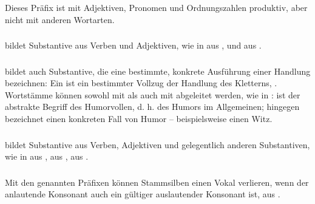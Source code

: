 Dieses Präfix ist mit Adjektiven, Pronomen und Ordnungszahlen produktiv, aber nicht mit anderen Wortarten.

\subsubsection{}  bildet Substantive aus Verben und Adjektiven, wie in   aus , und   aus  . 

\subsubsection{}  bildet auch Substantive, die eine bestimmte, konkrete Ausführung einer Handlung bezeichnen: Ein   ist ein bestimmter Vollzug der Handlung des Kletterns, . Wortstämme können sowohl mit  als auch mit  abgeleitet werden, wie in  :  ist der abstrakte Begriff des Humorvollen, d. h. des Humors im Allgemeinen;  hingegen bezeichnet einen konkreten Fall von Humor -- beispielsweise einen Witz. 

\subsubsection{}  bildet Substantive aus Verben, Adjektiven und gelegentlich anderen Substantiven, wie in   aus  ,   aus  ,   aus  . 

\subsubsection{} Mit den genannten Präfixen können Stammsilben einen Vokal verlieren, wenn der anlautende Konsonant auch ein gültiger auslautender Konsonant ist,   aus  .

